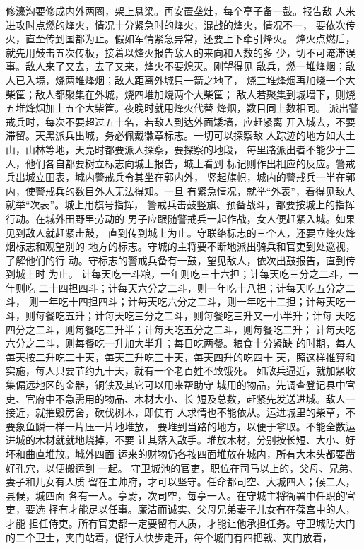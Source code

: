 \documentclass[12pt,UTF8]{ctexbook}
\begin{document}
修濠沟要修成内外两圈，架上悬梁。再安置垄灶，每个亭子备一鼓。报告敌 
人来进攻时点燃的烽火，情况十分紧急时的烽火，混战的烽火，情况不一， 
要依次传火，直至传到国都为止。假如军情紧急异常，还要上下牵引烽火。 
烽火点燃后，就先用鼓击五次传板，接着以烽火报告敌人的来向和人数的多 
少，切不可淹滞误事。敌人来了又去，去了又来，烽火不要熄灭。刚望得见 
敌兵，燃一堆烽烟；敌人已入境，烧两堆烽烟；敌人距离外城只一箭之地了， 
烧三堆烽烟再加烧一个大柴筐；敌人都聚集在外城，烧四堆加烧两个大柴筐； 
敌人若聚集到城墙下，则烧五堆烽烟加上五个大柴筐。夜晚时就用烽火代替 
烽烟，数目同上数相同。 
派出警戒兵时，每次不要超过五十名，若敌人到达外面矮墙，应赶紧离 
开入城去，不要滞留。天黑派兵出城，务必佩戴徽章标志。一切可以探察敌 
人踪迹的地方如大土山，山林等地，天亮时都要派人探察，要探察的地段， 
每里路派出者不能少于三人，他们各自都要树立标志向城上报告，城上看到 
标记则作出相应的反应。警戒兵出城立田表，城内警戒兵令其坐在郭内外， 
竖起旗帜，城内的警戒兵一半在郭内，使警戒兵的数目外人无法得知。一旦 
有紧急情况，就举“外表”，看得见敌人就举“次表”。城上用旗号指挥， 
警戒兵击鼓竖旗、预备战斗，都要按城上的指挥行动。在城外田野里劳动的 
男子应跟随警戒兵一起作战，女人便赶紧入城。如果见到敌人就赶紧击鼓， 
直到传到城上为止。守联络标志的三个人，还要立烽火烽烟标志和观望别的 
地方的标志。守城的主将要不断地派出骑兵和官吏到处巡视，了解他们的行 
动。守标志的警戒兵备有一鼓，望见敌人，依次出鼓报告，直到传到城上时 
为止。 
计每天吃一斗粮，一年则吃三十六担；计每天吃三分之二斗，一年则吃 
二十四担四斗；计每天六分之二斗，则一年吃十八担；计每天吃五分之二斗， 
则一年吃十四担四斗；计每天吃六分之二斗，则一年吃十二担；计每天吃一 
斗，则每餐吃五升；计每天吃三分之二斗，则每餐吃三升又一小半升；计每 
天吃四分之二斗，则每餐吃二升半；计每天吃五分之二斗，则每餐吃二升； 
计每天吃六分之二斗，则每餐吃一升加大半升；每日吃两餐。粮食十分紧缺 
的时期，每人每天按二升吃二十天，每天三升吃三十天，每天四升的吃四十 
天，照这样推算和实施，每人只要节约九十天，就有一个老百姓不致饿死。 
如敌兵逼近，就加紧收集偏远地区的金器，铜铁及其它可以用来帮助守 
城用的物品，先调查登记县中官吏、官府中不急需用的物品、木材大小、长 
短及总数，赶紧先发送进城。敌人一接近，就摧毁房舍，砍伐树木，即使有 
人求情也不能依从。运进城里的柴草，不要象鱼鳞一样一片压一片地堆放， 
要堆到当路的地方，以便于拿取。不能全数运进城的木材就就地烧掉，不要 
让其落入敌手。堆放木材，分别按长短、大小、好坏和曲直堆放。城外四面 
运来的财物仍各按四面堆放在城内，所有大木头都要凿好孔穴，以便搬运到 
一起。 
守卫城池的官吏，职位在司马以上的，父母、兄弟、妻子和儿女有人质 
留在主帅府，才可以坚守。任命都司空、大城四人；候二人，县候，城四面 
各有一人。亭尉，次司空，每亭一人。在守城主将衙署中任职的官吏，要选 
择有才能足以任事。廉洁而诚实、父母兄弟妻子儿女有在葆宫中的人，才能 
担任侍吏。所有官吏都一定要留有人质，才能让他承担任务。守卫城防大门 
的二个卫士，夹门站着，促行人快步走开，每个城门有四把戟、夹门放着， 
\end{document}

